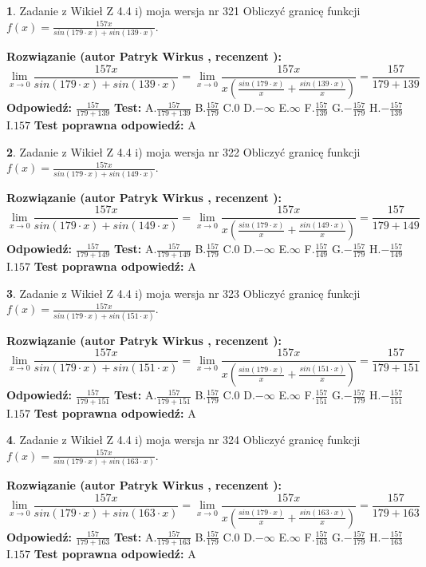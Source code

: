 \documentclass[12pt, a4paper]{article}
\theoremstyle{definition} %
\newtheorem{zad}{}
\newcommand{\zadStart}[1]{\begin{zad}#1\newline}
\newcommand{\zadStop}{\end{zad}}
\newcommand{\rozwStart}[2]{\noindent \textbf{Rozwiązanie (autor #1 , recenzent #2): }\newline}
\newcommand{\rozwStop}{\newline}
\newcommand{\odpStart}{\noindent \textbf{Odpowiedź:}\newline}
\newcommand{\odpStop}{\newline}
\newcommand{\testStart}{\noindent \textbf{Test:}\newline}
\newcommand{\testStop}{\newline}
\newcommand{\kluczStart}{\noindent \textbf{Test poprawna odpowiedź:}\newline}
\newcommand{\kluczStop}{\newline}
\begin{document}
\zadStart{Zadanie z Wikieł Z 4.4 i) moja wersja nr 321}
Obliczyć granicę funkcji $f(x)=\frac{157x}{sin(179\cdot x) +sin(139\cdot x)}$.
\zadStop
\rozwStart{Patryk Wirkus}{}
$$\lim\limits_{x\to 0}\frac{157x}{sin(179\cdot x) +sin(139\cdot x)}=\lim\limits_{x\to 0}\frac{157x}{x(\frac{sin(179\cdot x)}{x}+\frac{sin(139\cdot x)}{x})}=\frac{157}{179+139}$$
\rozwStop
\odpStart
$\frac{157}{179+139}$
\odpStop
\testStart
A.$\frac{157}{179+139}$
B.$\frac{157}{179}$
C.$0$
D.$-\infty$
E.$\infty$
F.$\frac{157}{139}$
G.$-\frac{157}{179}$
H.$-\frac{157}{139}$
I.$157$
\testStop
\kluczStart
A
\kluczStop



\zadStart{Zadanie z Wikieł Z 4.4 i) moja wersja nr 322}
Obliczyć granicę funkcji $f(x)=\frac{157x}{sin(179\cdot x) +sin(149\cdot x)}$.
\zadStop
\rozwStart{Patryk Wirkus}{}
$$\lim\limits_{x\to 0}\frac{157x}{sin(179\cdot x) +sin(149\cdot x)}=\lim\limits_{x\to 0}\frac{157x}{x(\frac{sin(179\cdot x)}{x}+\frac{sin(149\cdot x)}{x})}=\frac{157}{179+149}$$
\rozwStop
\odpStart
$\frac{157}{179+149}$
\odpStop
\testStart
A.$\frac{157}{179+149}$
B.$\frac{157}{179}$
C.$0$
D.$-\infty$
E.$\infty$
F.$\frac{157}{149}$
G.$-\frac{157}{179}$
H.$-\frac{157}{149}$
I.$157$
\testStop
\kluczStart
A
\kluczStop



\zadStart{Zadanie z Wikieł Z 4.4 i) moja wersja nr 323}
Obliczyć granicę funkcji $f(x)=\frac{157x}{sin(179\cdot x) +sin(151\cdot x)}$.
\zadStop
\rozwStart{Patryk Wirkus}{}
$$\lim\limits_{x\to 0}\frac{157x}{sin(179\cdot x) +sin(151\cdot x)}=\lim\limits_{x\to 0}\frac{157x}{x(\frac{sin(179\cdot x)}{x}+\frac{sin(151\cdot x)}{x})}=\frac{157}{179+151}$$
\rozwStop
\odpStart
$\frac{157}{179+151}$
\odpStop
\testStart
A.$\frac{157}{179+151}$
B.$\frac{157}{179}$
C.$0$
D.$-\infty$
E.$\infty$
F.$\frac{157}{151}$
G.$-\frac{157}{179}$
H.$-\frac{157}{151}$
I.$157$
\testStop
\kluczStart
A
\kluczStop



\zadStart{Zadanie z Wikieł Z 4.4 i) moja wersja nr 324}
Obliczyć granicę funkcji $f(x)=\frac{157x}{sin(179\cdot x) +sin(163\cdot x)}$.
\zadStop
\rozwStart{Patryk Wirkus}{}
$$\lim\limits_{x\to 0}\frac{157x}{sin(179\cdot x) +sin(163\cdot x)}=\lim\limits_{x\to 0}\frac{157x}{x(\frac{sin(179\cdot x)}{x}+\frac{sin(163\cdot x)}{x})}=\frac{157}{179+163}$$
\rozwStop
\odpStart
$\frac{157}{179+163}$
\odpStop
\testStart
A.$\frac{157}{179+163}$
B.$\frac{157}{179}$
C.$0$
D.$-\infty$
E.$\infty$
F.$\frac{157}{163}$
G.$-\frac{157}{179}$
H.$-\frac{157}{163}$
I.$157$
\testStop
\kluczStart
A
\kluczStop
\end{document}

